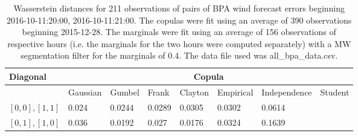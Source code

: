 \begin{table}[h] 
    \centering 
    \begin{tabular}{|l|l|l|l|l|l|l|l|} \hline 
        \textbf{Diagonal} & \multicolumn{7}{c|}{\textbf{Copula}} \\ \hline 
        & Gaussian & Gumbel & Frank & Clayton & Empirical & Independence & Student \\ \hline 
        $[0,0], [1,1]$ & 0.024 & 0.0244 & 0.0289 & 0.0305 & 0.0302 & 0.0614 &  \\ \hline 
        $[0,1], [1,0]$ & 0.036 & 0.0192 & 0.027 & 0.0176 & 0.0324 & 0.1639 &  \\ \hline 
    \end{tabular} 
    \caption{Wasserstein distances for 211 observations of pairs of BPA wind forecast errors beginning 2016-10-11:20:00, 2016-10-11:21:00. The copulas were fit  using an average of 390 observations beginning 2015-12-28. The marginals were fit using an average of 156 observations of respective hours (i.e. the  marginals for the two hours were computed separately) with a MW segmentation filter for the marginals of 0.4. The data file used was all\_bpa\_data.csv.} 
\end{table}
